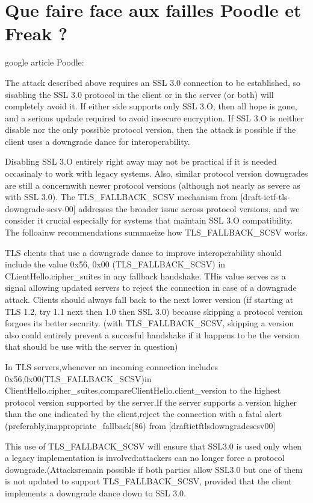 \section{Que faire face aux failles Poodle et Freak ?}

google article Poodle:

The attack described above requires an SSL 3.0 connection to be established, so sisabling the SSL 3.0 protocol in the client or in the server (or both) will completely avoid it. If either side supports only SSL 3.O, then all hope is gone, and a serious updade required to avoid insecure encryption. If SSL 3.O is neither disable nor the only possible protocol version, then the attack is possible if the client uses a downgrade dance for interoperability. 

Disabling SSL 3.O entirely right away may not be practical if it is needed occasinaly to work with legacy systems. Also, similar protocol version downgrades are still a concernwith newer protocol versions (although not nearly as severe as with SSL 3.0). The TLS\_FALLBACK\_SCSV mechanism from [draft-ietf-tls-downgrade-scsv-00] addresses the broader issue across protocol versions, and we consider it crucial especially for systems that maintain SSL 3.O compatibility. The folloainw recommendations summaeize how TLS\_FALLBACK\_SCSV works.

TLS clients that use a downgrade dance to improve interoperability should include the value 0x56, 0x00 (TLS\_FALLBACK\_SCSV) in CLientHello.cipher\_suites in any fallback handshake. THis value serves as a signal allowing updated servers to reject the connection in case of a downgrade attack. Clients should always fall back to the next lower version (if starting at TLS 1.2, try 1.1 next then 1.0 then SSL 3.0) because skipping a protocol version forgoes its better security. (with TLS\_FALLBACK\_SCSV, skipping a version also could entirely prevent a succesful handshake if it happens to be the version that should be use with the server in question)

In TLS servers,whenever an incoming connection includes 0x56,0x00(TLS\_FALLBACK\_SCSV)in ClientHello.cipher\_suites,compareClientHello.client\_version to the highest protocol version supported by the server.If the server supports a version higher than the one indicated by the client,reject the connection with a fatal alert (preferably,inappropriate\_fallback(86) from [draftietftlsdowngradescsv00]

This use of TLS\_FALLBACK\_SCSV will ensure that SSL3.0 is used only when a legacy implementation is involved:attackers can no longer force a protocol downgrade.(Attacksremain possible if both parties allow SSL3.0 but one of them is not updated to support TLS\_FALLBACK\_SCSV, provided that the client implements a downgrade dance down to SSL 3.0.




